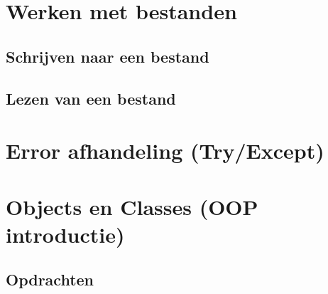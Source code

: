 \documentclass[a4paper,12pt,twoside,openright,titlepage]{book}
\begin{document}
\chapter{Werken met bestanden}

\section{Schrijven naar een bestand}

\section{Lezen van een bestand}


\chapter{Error afhandeling (Try/Except)}



\chapter{Objects en Classes (OOP introductie)}

\section{Opdrachten}




\end{document}

